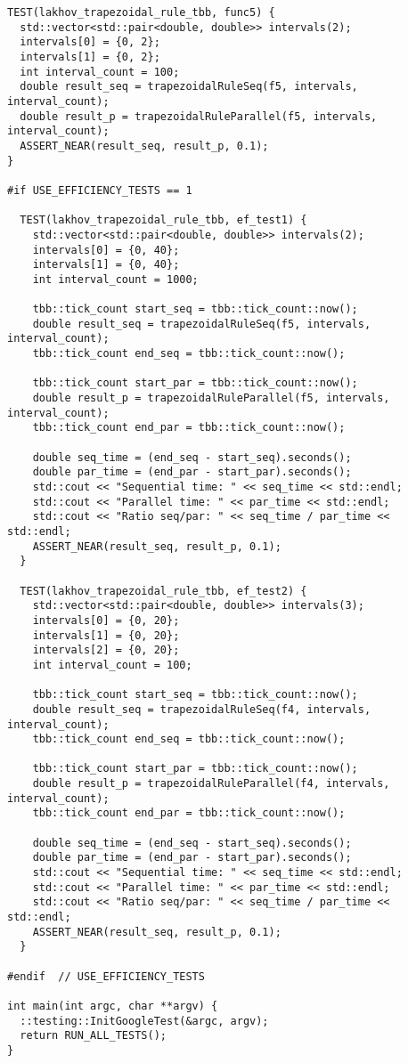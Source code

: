 \documentclass{report}
\begin{document}
\begin{lstlisting}
TEST(lakhov_trapezoidal_rule_tbb, func5) {
  std::vector<std::pair<double, double>> intervals(2);
  intervals[0] = {0, 2};
  intervals[1] = {0, 2};
  int interval_count = 100;
  double result_seq = trapezoidalRuleSeq(f5, intervals, interval_count);
  double result_p = trapezoidalRuleParallel(f5, intervals, interval_count);
  ASSERT_NEAR(result_seq, result_p, 0.1);
}

#if USE_EFFICIENCY_TESTS == 1

  TEST(lakhov_trapezoidal_rule_tbb, ef_test1) {
    std::vector<std::pair<double, double>> intervals(2);
    intervals[0] = {0, 40};
    intervals[1] = {0, 40};
    int interval_count = 1000;

    tbb::tick_count start_seq = tbb::tick_count::now();
    double result_seq = trapezoidalRuleSeq(f5, intervals, interval_count);
    tbb::tick_count end_seq = tbb::tick_count::now();

    tbb::tick_count start_par = tbb::tick_count::now();
    double result_p = trapezoidalRuleParallel(f5, intervals, interval_count);
    tbb::tick_count end_par = tbb::tick_count::now();

    double seq_time = (end_seq - start_seq).seconds();
    double par_time = (end_par - start_par).seconds();
    std::cout << "Sequential time: " << seq_time << std::endl;
    std::cout << "Parallel time: " << par_time << std::endl;
    std::cout << "Ratio seq/par: " << seq_time / par_time << std::endl;
    ASSERT_NEAR(result_seq, result_p, 0.1);
  }

  TEST(lakhov_trapezoidal_rule_tbb, ef_test2) {
    std::vector<std::pair<double, double>> intervals(3);
    intervals[0] = {0, 20};
    intervals[1] = {0, 20};
    intervals[2] = {0, 20};
    int interval_count = 100;

    tbb::tick_count start_seq = tbb::tick_count::now();
    double result_seq = trapezoidalRuleSeq(f4, intervals, interval_count);
    tbb::tick_count end_seq = tbb::tick_count::now();

    tbb::tick_count start_par = tbb::tick_count::now();
    double result_p = trapezoidalRuleParallel(f4, intervals, interval_count);
    tbb::tick_count end_par = tbb::tick_count::now();

    double seq_time = (end_seq - start_seq).seconds();
    double par_time = (end_par - start_par).seconds();
    std::cout << "Sequential time: " << seq_time << std::endl;
    std::cout << "Parallel time: " << par_time << std::endl;
    std::cout << "Ratio seq/par: " << seq_time / par_time << std::endl;
    ASSERT_NEAR(result_seq, result_p, 0.1);
  }

#endif  // USE_EFFICIENCY_TESTS

int main(int argc, char **argv) {
  ::testing::InitGoogleTest(&argc, argv);
  return RUN_ALL_TESTS();
}
\end{lstlisting}
\end{document}
